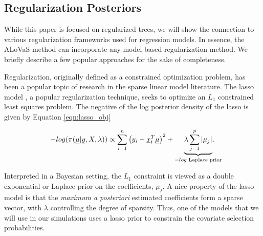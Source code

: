 	\subsection{Regularization Posteriors}\label{subsec:Regularization Priors}
		While this paper is focused on regularized trees, we will show the connection to various regularization frameworks used for regression models. In essence, the ALoVaS method can incorporate any model based regularization method. We briefly describe a few popular approaches for the sake of completeness. 
		
		Regularization, originally defined as a constrained optimization problem, has been a popular topic of research in the sparse linear model literature. The lasso model \cite{tibshirani1996regression}, a popular regularization technique, seeks to optimize an $L_1$ constrained least squares problem. The negative of the log posterior density of the lasso is given by Equation \ref{eqn:lasso_obj}
		
		\begin{equation}\label{eqn:lasso_obj}
		-log(\pi(\vec{\mu} \vert \vec{y}, X, \lambda )) \propto \sum_{i=1}^n\left(y_i - \vec{x}_i^T\vec{\mu}\right)^2 + \underbrace{\lambda \sum_{j=1}^p \vert \mu_j \vert}_{\text{$-log$ Laplace prior}}\hspace{-0.5cm}.
		\end{equation}
		
\noindent Interpreted in a Bayesian setting, the $L_1$ constraint is viewed as a double exponential or Laplace prior on the coefficients, $\mu_j$. A nice property of the lasso model is that the \emph{maximum a posteriori} estimated coefficients form a sparse vector, with $\lambda$ controlling the degree of sparsity. Thus, one of the models that we will use in our simulations uses a lasso prior to constrain the covariate selection probabilities. 

